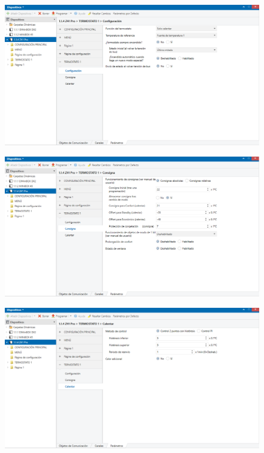 \documentclass[10pt]{article}
\begin{document}
\begin{figure}[H]
	\begin{center}
	 		\includegraphics[width = 1.00\textwidth]{Imagenes/img28}
	\end{center} 
\end{figure}

\begin{figure}[H]
	\begin{center}
	 		\includegraphics[width = 1.00\textwidth]{Imagenes/img29}
	\end{center} 
\end{figure}

\begin{figure}[H]
	\begin{center}
	 		\includegraphics[width = 1.00\textwidth]{Imagenes/img30}
	\end{center} 
\end{figure}
\end{document}
